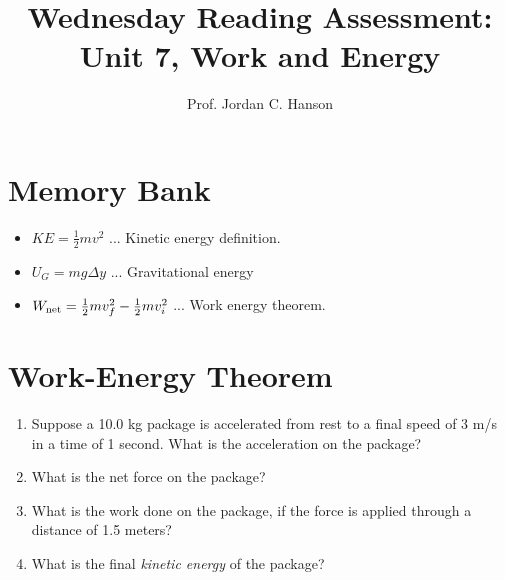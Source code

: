 \documentclass{article}
\begin{document}
\title{Wednesday Reading Assessment: Unit 7, Work and Energy}
\author{Prof. Jordan C. Hanson}

\maketitle

\section{Memory Bank}

\begin{itemize}
\item $KE = \frac{1}{2}mv^2$ ... Kinetic energy definition.
\item $U_G = m g \Delta y$ ... Gravitational energy
\item $W_{\rm net} = \frac{1}{2}mv_f^2 - \frac{1}{2}mv_i^2$ ... Work energy theorem.
\end{itemize}

\section{Work-Energy Theorem}

\begin{enumerate}
\item Suppose a 10.0 kg package is accelerated from rest to a final speed of 3 m/s in a time of 1 second.  What is the acceleration on the package? \\ \vspace{1.5cm}
\item What is the net force on the package? \\ \vspace{1.5cm}
\item What is the work done on the package, if the force is applied through a distance of 1.5 meters? \\ \vspace{1.5cm}
\item What is the final \textit{kinetic energy} of the package? \\ \vspace{1.5cm}
\end{enumerate}
\end{document}
